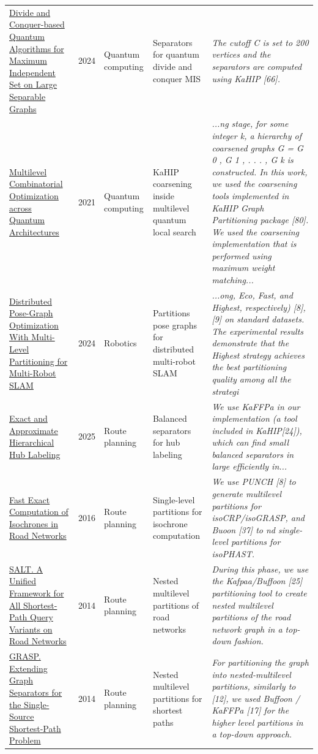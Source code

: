 \documentclass[9pt]{extarticle}
\begin{document}
\begin{longtable}{@{}>{\raggedright}p{6.6cm}r>{\raggedright}p{2.9cm}>{\raggedright}p{4.6cm}>{\raggedright\arraybackslash}p{8.4cm}@{}}
\href{https://doi.org/10.1109/QCE60285.2024.00020}{Divide and Conquer-based Quantum Algorithms for Maximum Independent Set on Large Separable Graphs} & 2024 & Quantum computing & Separators for quantum divide and conquer MIS & {\footnotesize\itshape The cutoff C is set to 200 vertices and the separators are computed using KaHIP [66].}\\
\href{https://doi.org/10.1145/3425607}{Multilevel Combinatorial Optimization across Quantum Architectures} & 2021 & Quantum computing & KaHIP coarsening inside multilevel quantum local search & {\footnotesize\itshape ...ng stage, for some integer k, a hierarchy of coarsened graphs G = G 0 , G 1 , . . . , G k is constructed. In this work, we used the coarsening tools implemented in KaHIP Graph Partitioning package [80]. We used the coarsening implementation that is performed using maximum weight matching...}\\
\href{https://doi.org/10.1109/lra.2024.3382531}{Distributed Pose-Graph Optimization With Multi-Level Partitioning for Multi-Robot SLAM} & 2024 & Robotics & Partitions pose graphs for distributed multi-robot SLAM & {\footnotesize\itshape ...ong, Eco, Fast, and Highest, respectively) [8], [9] on standard datasets. The experimental results demonstrate that the Highest strategy achieves the best partitioning quality among all the strategi}\\
\href{https://doi.org/10.7155/jgaa.v29i2.3041}{Exact and Approximate Hierarchical Hub Labeling} & 2025 & Route planning & Balanced separators for hub labeling & {\footnotesize\itshape We use KaFFPa in our implementation (a tool included in KaHIP[24]), which can find small balanced separators in large efficiently in...}\\
\href{https://doi.org/10.1007/978-3-319-38851-9_2}{Fast Exact Computation of Isochrones in Road Networks} & 2016 & Route planning & Single-level partitions for isochrone computation & {\footnotesize\itshape We use PUNCH [8] to generate multilevel partitions for isoCRP/isoGRASP, and Buoon [37] to nd single-level partitions for isoPHAST.}\\
\href{https://doi.org/10.1007/978-3-319-20086-6_23}{SALT. A Unified Framework for All Shortest-Path Query Variants on Road Networks} & 2014 & Route planning & Nested multilevel partitions of road networks & {\footnotesize\itshape During this phase, we use the Kafpaa/Buffoon [25] partitioning tool to create nested multilevel partitions of the road network graph in a top-down fashion.}\\
\href{https://doi.org/10.1007/978-3-662-44777-2_30}{GRASP. Extending Graph Separators for the Single-Source Shortest-Path Problem} & 2014 & Route planning & Nested multilevel partitions for shortest paths & {\footnotesize\itshape For partitioning the graph into nested-multilevel partitions, similarly to [12], we used Buffoon / KaFFPa [17] for the higher level partitions in a top-down approach.}\\

\end{longtable}
\end{document}
